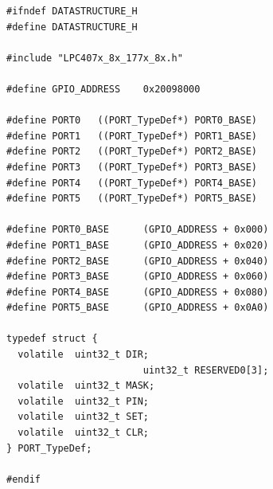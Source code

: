 \documentclass{article}
\begin{document}
\begin{lstlisting}
#ifndef DATASTRUCTURE_H
#define DATASTRUCTURE_H

#include "LPC407x_8x_177x_8x.h"

#define GPIO_ADDRESS	0x20098000

#define PORT0	((PORT_TypeDef*) PORT0_BASE)
#define PORT1	((PORT_TypeDef*) PORT1_BASE)
#define PORT2	((PORT_TypeDef*) PORT2_BASE)
#define PORT3	((PORT_TypeDef*) PORT3_BASE)
#define PORT4	((PORT_TypeDef*) PORT4_BASE)
#define PORT5	((PORT_TypeDef*) PORT5_BASE)

#define PORT0_BASE		(GPIO_ADDRESS + 0x000)
#define PORT1_BASE		(GPIO_ADDRESS + 0x020)
#define PORT2_BASE		(GPIO_ADDRESS + 0x040)
#define PORT3_BASE		(GPIO_ADDRESS + 0x060)
#define PORT4_BASE		(GPIO_ADDRESS + 0x080)
#define PORT5_BASE		(GPIO_ADDRESS + 0x0A0)

typedef struct {
  volatile	uint32_t DIR;
						uint32_t RESERVED0[3];
  volatile	uint32_t MASK;
  volatile	uint32_t PIN;
  volatile	uint32_t SET;
  volatile  uint32_t CLR;
} PORT_TypeDef;

#endif
\end{lstlisting}
\end{document}

